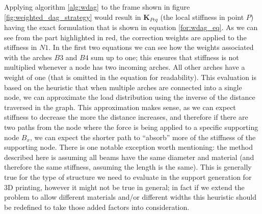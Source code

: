 Applying algorithm \ref{alg:wdag} to the frame shown in figure \ref{fig:weighted_dag_strategy} would result 
in $\mathbf{K}_{Peq}$ (the local stiffness in point $P$) having the exact formulation that is shown in equation \ref{for:wdag_eq}.
As we can see from the part highlighted in red, the correction weights are applied to the stiffness in $N1$.
In the first two equations we can see how the weights associated with the arches $B3$ and $B4$ sum up to one;
this ensures that stiffness is not multiplied whenever a node has two incoming arches. All other arches
have a weight of one (that is omitted in the equation for readability).
This evaluation is based on the heuristic that when multiple arches are connected into a single node,
we can approximate the load distribution using the inverse of the distance traversed in the graph.
This approximation makes sense, as we can expect stiffness to decrease the more the distance increases,
and therefore if there are two paths from the node where the force is being applied to a specific supporting
node $B_x$, we can expect the shorter path to ``absorb'' more of the stiffness of the supporting node.
There is one notable exception worth mentioning: the method described here is assuming all beams
have the same diameter and material (and therefore the same stiffness, assuming the length is the same).
This is generally true for the type of structure we need to evaluate in the support generation for 3D printing,
however it might not be true in general; in fact if we extend the problem to allow different materials and/or
different widths this heuristic should be redefined to take those added factors into consideration.





